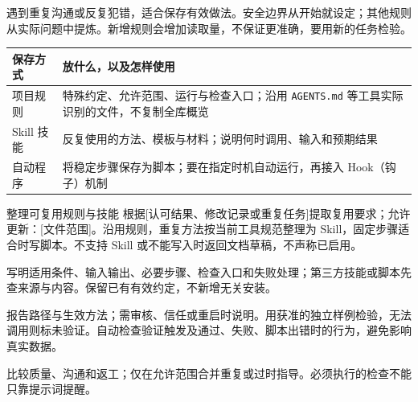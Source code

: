 遇到重复沟通或反复犯错，适合保存有效做法。安全边界从开始就设定；其他规则从实际问题中提炼。新增规则会增加读取量，不保证更准确，要用新的任务检验。
\begin{tabularx}{\linewidth}{@{}L{29mm}Y@{}}
\toprule 保存方式 & 放什么，以及怎样使用\\\midrule
项目规则 & 特殊约定、允许范围、运行与检查入口；沿用 \texttt{AGENTS.md} 等工具实际识别的文件，不复制全库概览\\
Skill 技能 & 反复使用的方法、模板与材料；说明何时调用、输入和预期结果\\
自动程序 & 将稳定步骤保存为脚本；要在指定时机自动运行，再接入 Hook（钩子）机制\\
\bottomrule\end{tabularx}
\begin{prompt}{整理可复用规则与技能}
根据[认可结果、修改记录或重复任务]提取复用要求；允许更新：[文件范围]。沿用规则，重复方法按当前工具规范整理为 Skill，固定步骤适合时写脚本。不支持 Skill 或不能写入时返回文档草稿，不声称已启用。\par
写明适用条件、输入输出、必要步骤、检查入口和失败处理；第三方技能或脚本先查来源与内容。保留已有有效约定，不新增无关安装。\par
报告路径与生效方法；需审核、信任或重启时说明。用获准的独立样例检验，无法调用则标未验证。自动检查验证触发及通过、失败、脚本出错时的行为，避免影响真实数据。\par
比较质量、沟通和返工；仅在允许范围合并重复或过时指导。必须执行的检查不能只靠提示词提醒。
\end{prompt}
